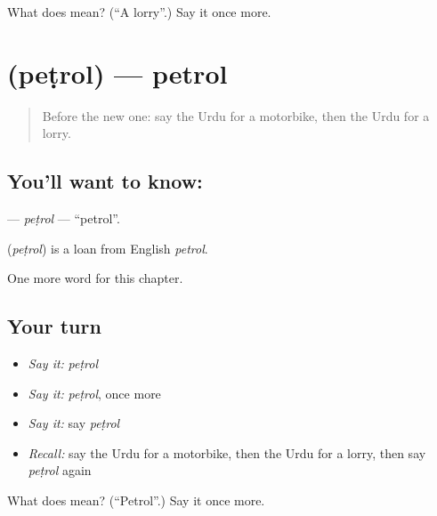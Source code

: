 \begin{tcolorbox}[breakable,colback=teal!4,colframe=teal!35!black,title={Before you move on}]
What does  mean? (\textquotedblleft{}A lorry\textquotedblright{}.) Say it once more.
\end{tcolorbox}
\section[\texorpdfstring{\ur{پیٹرول} (peṭrol)}{پیٹرول (peṭrol)}]{ (peṭrol) — petrol}

\label{lesson:UR-C229-petrol}



\begin{quote}
Before the new one: say the Urdu for a motorbike, then the Urdu for a lorry.
\end{quote}

\subsection*{You'll want to know: }
\textbf{} — \emph{peṭrol} — \textquotedblleft{}petrol\textquotedblright{}.

\begin{cousinweb}
\textbf{} (\emph{peṭrol}) is a loan from English \emph{petrol}.
\end{cousinweb}

\begin{grammarlens}[title={What you've built}]
One more word for this chapter.
\end{grammarlens}

\subsection*{Your turn}
\begin{itemize}
\raggedright
  \item \emph{Say it:} \emph{peṭrol}
  \item \emph{Say it:} \emph{peṭrol}, once more
  \item \emph{Say it:} say \emph{peṭrol}
  \item \emph{Recall:} say the Urdu for a motorbike, then the Urdu for a lorry, then say \emph{peṭrol} again
\end{itemize}

\begin{tcolorbox}[breakable,colback=teal!4,colframe=teal!35!black,title={Before you move on}]
What does  mean? (\textquotedblleft{}Petrol\textquotedblright{}.) Say it once more.
\end{tcolorbox}
